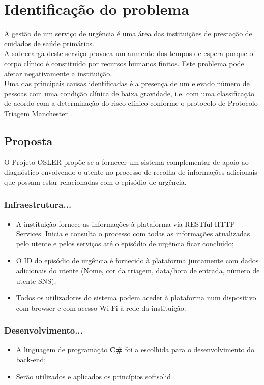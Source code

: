 
\chapter{Identificação do problema}

A gestão de um serviço de urgência é uma área das instituições de prestação de cuidados de saúde primários. \\ 
A sobrecarga deste serviço provoca um aumento dos tempos de espera porque o corpo clínico é constituído por recursos humanos finitos. Este problema pode afetar negativamente a instituição. \\ 
Uma das principais causas identificadas é a presença de um elevado número de pessoas com uma condição clínica de baixa gravidade, i.e. com uma classificação de acordo com a determinação do risco clínico conforme o protocolo de Protocolo Triagem Manchester \citep{Triagem2022}. 



\section{Proposta}
O Projeto OSLER propõe-se a fornecer um sistema complementar de apoio ao diagnóstico envolvendo o utente no processo de recolha de informações adicionais que possam estar relacionadas com o episódio de urgência.  



\subsection{Infraestrutura...}
\begin{itemize}
	\item A instituição fornece as informações à plataforma via RESTful HTTP Services. Inicia e consulta o processo com todas as informações atualizadas pelo utente e pelos serviços até o episódio de urgência ficar concluído;
	\item O ID do episódio de urgência é fornecido à plataforma juntamente com dados adicionais do utente (Nome, cor da triagem, data/hora de entrada, número de utente SNS);
	\item Todos os utilizadores do sistema podem aceder à plataforma num dispositivo com browser e com acesso Wi-Fi à rede da instituição.
\end{itemize}



\subsection{Desenvolvimento...}
\begin{itemize}
	\item A linguagem de programação \textbf{C\#} foi a escolhida para o desenvolvimento do back-end;
	\item Serão utilizados e aplicados os princípios \acrshort{softsolid} \citep{Naidu2021}.
\end{itemize}



